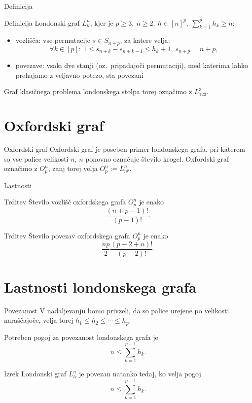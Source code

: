 \documentclass[dvipsnames]{beamer}
\begin{document}
\begin{frame}{Definicija}
    \begin{block}{Definicija}
        \alert{Londonski graf} $L_h^n$, kjer je $p \geq 3,\ n \geq 2,\ h \in [n]^p,\  \sum_{k=1}^p h_k \geq n$:
        \begin{itemize}
            \item vozlišča: vse permutacije $s \in S_{n+p}$, za katere velja:
            \[\forall k \in [p]:\ 1 \leq s_{n+k} - s_{n+k-1} \leq h_k + 1,\ s_{n+p} = n + p ,\]
            \item povezave: vsaki dve stanji (oz.\ pripadajoči permutaciji), med katerima lahko prehajamo z veljavno potezo, sta povezani
        \end{itemize}
    \end{block}
    \medskip
    Graf klasičnega problema londonskega stolpa torej označimo z $L^3_{123}$.

\end{frame}

\section{Oxfordski graf}
\begin{frame}{Oxfordski graf}
    \alert{Oxfordski graf} je poseben primer londonskega grafa, pri katerem so vse palice velikosti $n$, $n$ ponovno označuje število krogel. Oxfordski graf označimo z $O^n_p$, zanj torej velja $O^n_p := L^n_{n^p}$.
\end{frame}

\begin{frame}{Lastnosti}
    \begin{block}{Trditev}
        Število vozlišč oxfordskega grafa $O^n_p$ je enako \[\frac{(n+p-1)!}{(p-1)!}.\]
    \end{block}    
    \begin{block}{Trditev}
        Število povezav oxfordskega grafa $O^n_p$ je enako
        \[ \frac{np}{2} \frac{(p-2+n)!}{(p-2)!} .\]
    \end{block}    
\end{frame}

\section{Lastnosti londonskega grafa}
\begin{frame}{Povezanost}
    V nadaljevanju bomo privzeli, da so palice urejene po velikosti naraščajoče, velja torej $h_1 \leq h_2 \leq \cdots \leq h_p$.
    
    Potreben pogoj za povezanost londonskega grafa je 
    \[ n \leq \sum_{k=1}^{p-1} h_k. \]
    \begin{block}{Izrek}
        Londonski graf $L_h^n$ je povezan natanko tedaj, ko velja pogoj
        \[ n \leq \sum_{k=1}^{p-1} h_k. \]
    \end{block}
\end{frame}
\end{document}

